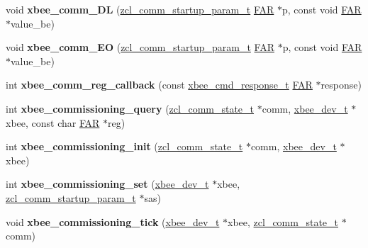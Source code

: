 \begin{DoxyCompactItemize}
\item 
\mbox{\label{group__xbee__commissioning_ga337f66d75fea43d5a792ffd534e2f65c}} 
void {\bfseries xbee\+\_\+comm\+\_\+\+DL} (\hyperlink{structzcl__comm__startup__param__t}{zcl\+\_\+comm\+\_\+startup\+\_\+param\+\_\+t} \hyperlink{group__hal_gaef060b3456fdcc093a7210a762d5f2ed}{F\+AR} $\ast$p, const void \hyperlink{group__hal_gaef060b3456fdcc093a7210a762d5f2ed}{F\+AR} $\ast$value\+\_\+be)
\item 
\mbox{\label{group__xbee__commissioning_ga22b333ec115d26b72abc100fc5d3c431}} 
void {\bfseries xbee\+\_\+comm\+\_\+\+EO} (\hyperlink{structzcl__comm__startup__param__t}{zcl\+\_\+comm\+\_\+startup\+\_\+param\+\_\+t} \hyperlink{group__hal_gaef060b3456fdcc093a7210a762d5f2ed}{F\+AR} $\ast$p, const void \hyperlink{group__hal_gaef060b3456fdcc093a7210a762d5f2ed}{F\+AR} $\ast$value\+\_\+be)
\item 
\mbox{\label{group__xbee__commissioning_gaec84ef238a638e643c6f8b363630d636}} 
int {\bfseries xbee\+\_\+comm\+\_\+reg\+\_\+callback} (const \hyperlink{structxbee__cmd__response__t}{xbee\+\_\+cmd\+\_\+response\+\_\+t} \hyperlink{group__hal_gaef060b3456fdcc093a7210a762d5f2ed}{F\+AR} $\ast$response)
\item 
\mbox{\label{group__xbee__commissioning_ga4927f3fc029f50dbbd1ec3e0292e873b}} 
int {\bfseries xbee\+\_\+commissioning\+\_\+query} (\hyperlink{structzcl__comm__state__t}{zcl\+\_\+comm\+\_\+state\+\_\+t} $\ast$comm, \hyperlink{structxbee__dev__t}{xbee\+\_\+dev\+\_\+t} $\ast$xbee, const char \hyperlink{group__hal_gaef060b3456fdcc093a7210a762d5f2ed}{F\+AR} $\ast$reg)
\item 
\mbox{\label{group__xbee__commissioning_ga9c6e11a80f7544775d5e0d855f840334}} 
int {\bfseries xbee\+\_\+commissioning\+\_\+init} (\hyperlink{structzcl__comm__state__t}{zcl\+\_\+comm\+\_\+state\+\_\+t} $\ast$comm, \hyperlink{structxbee__dev__t}{xbee\+\_\+dev\+\_\+t} $\ast$xbee)
\item 
\mbox{\label{group__xbee__commissioning_ga6fb796928aa5ff990ca4b62c4893bc2c}} 
int {\bfseries xbee\+\_\+commissioning\+\_\+set} (\hyperlink{structxbee__dev__t}{xbee\+\_\+dev\+\_\+t} $\ast$xbee, \hyperlink{structzcl__comm__startup__param__t}{zcl\+\_\+comm\+\_\+startup\+\_\+param\+\_\+t} $\ast$sas)
\item 
\mbox{\label{group__xbee__commissioning_gadd6acaa6c6403e9371358da445f3f194}} 
void {\bfseries xbee\+\_\+commissioning\+\_\+tick} (\hyperlink{structxbee__dev__t}{xbee\+\_\+dev\+\_\+t} $\ast$xbee, \hyperlink{structzcl__comm__state__t}{zcl\+\_\+comm\+\_\+state\+\_\+t} $\ast$comm)
\end{DoxyCompactItemize}
